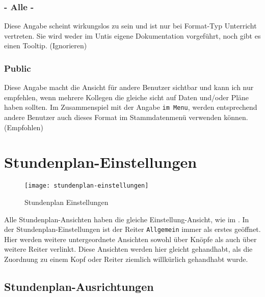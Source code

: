 \subsubsection{- Alle -}
Diese Angabe scheint wirkungslos zu sein und ist nur bei Format-Typ Unterricht vertreten. Sie wird weder im Untis eigene Dokumentation vorgeführt, noch gibt es einen Tooltip. (Ignorieren)\\

\subsubsection{Public}
Diese Angabe macht die Ansicht für andere Benutzer sichtbar und kann ich nur empfehlen, wenn mehrere Kollegen die gleiche sicht auf Daten und/oder Pläne haben sollten. Im Zusammenspiel mit der Angabe \texttt{im Menu}, werden entsprechend andere Benutzer auch dieses Format im Stammdatenmenü verwenden können. (Empfohlen)\\

\section{Stundenplan-Einstellungen}
\label{sec:stundenplan-einstellungen}

\begin{wrapfigure}{r}{0.4\textwidth}
	\vspace{-14pt}
	\centering
	\texttt{[image: stundenplan-einstellungen]}
	\vspace{-5pt}
	\caption{Stundenplan Einstellungen}
	\label{fig:stundenplan-einstellungen}
	\vspace{-50pt}
\end{wrapfigure}

Alle Stundenplan-Ansichten haben die gleiche Einstellung-Ansicht, wie im . In der Stundenplan-Einstellungen ist der Reiter \texttt{Allgemein} immer als erstes geöffnet. Hier werden weitere untergeordnete Ansichten sowohl über Knöpfe als auch über weitere Reiter verlinkt. Diese Ansichten werden hier gleicht gehandhabt, als die Zuordnung zu einem Kopf oder Reiter ziemlich willkürlich gehandhabt wurde.\\

\vspace{20pt}

\subsection{Stundenplan-Ausrichtungen}
\label{sec:stundenplan-formate}

